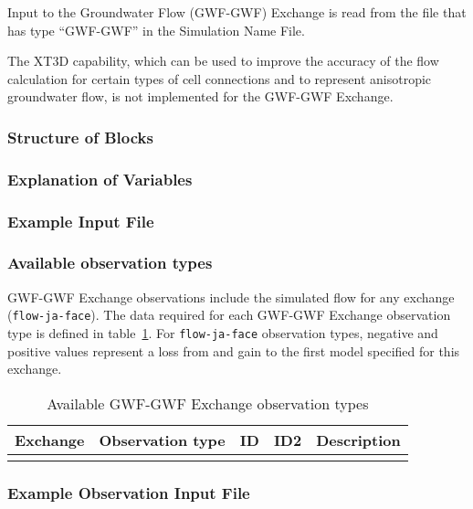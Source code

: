 Input to the Groundwater Flow (GWF-GWF) Exchange is read from the file that has type ``GWF-GWF'' in the Simulation Name File.

The XT3D capability, which can be used to improve the accuracy of the flow calculation for certain types of cell connections and to represent anisotropic groundwater flow, is not implemented for the GWF-GWF Exchange.

\vspace{5mm}
\subsubsection{Structure of Blocks}




\vspace{5mm}
\subsubsection{Explanation of Variables}
\begin{description}

\end{description}

\vspace{5mm}
\subsubsection{Example Input File}


\vspace{5mm}
\subsubsection{Available observation types}
GWF-GWF Exchange observations include the simulated flow for any exchange (\texttt{flow-ja-face}). The data required for each GWF-GWF Exchange observation type is defined in table~\ref{table:gwf-gwfobstype}. For \texttt{flow-ja-face} observation types, negative and positive values represent a loss from and gain to the first model specified for this exchange.

\begin{longtable}{p{2cm} p{2.75cm} p{2cm} p{1.25cm} p{7cm}}
\caption{Available GWF-GWF Exchange observation types} \tabularnewline

\hline
\hline
\textbf{Exchange} & \textbf{Observation type} & \textbf{ID} & \textbf{ID2} & \textbf{Description} \\
\hline
\endhead

\hline
\endfoot


\label{table:gwf-gwfobstype}
\end{longtable}


\vspace{5mm}
\subsubsection{Example Observation Input File}


